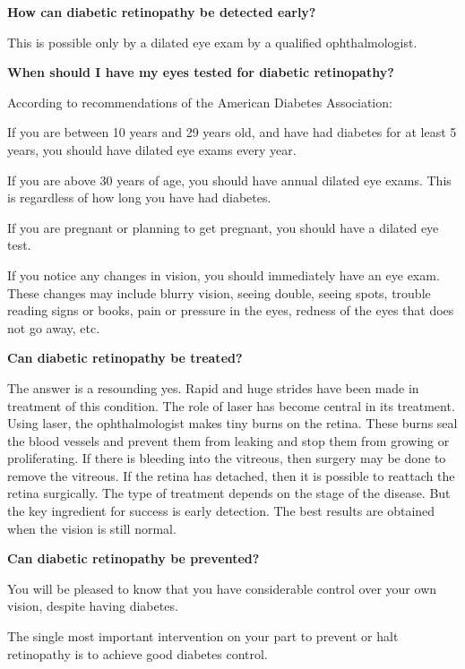 {\textbf{How can diabetic retinopathy be detected early?}

This is possible only by a dilated eye exam by a qualified ophthalmologist.

\textbf{When should I have my eyes tested for diabetic retinopathy?}

According to recommendations of the American Diabetes Association:

\item If you are between 10 years and 29 years old, and have had diabetes for at least 5 years, you should have dilated eye exams every year.

 \item If you are above 30 years of age, you should have annual dilated eye exams. This is regardless of how long you have had diabetes.

 \item If you are pregnant or planning to get pregnant, you should have a dilated eye test.

 \item If you notice any changes in vision, you should immediately have an eye exam. These changes may include blurry vision, seeing double, seeing spots, trouble reading signs or books, pain or pressure in the eyes, redness of the eyes that does not go away, etc.

\textbf{Can diabetic retinopathy be treated?}

The answer is a resounding yes. Rapid and huge strides have been made in treatment of this condition. The role of laser has become central in its treatment. Using laser, the ophthalmologist makes tiny burns on the retina. These burns seal the blood vessels and prevent them from leaking and stop them from growing or proliferating. If there is bleeding into the vitreous, then surgery may be done to remove the vitreous. If the retina has detached, then it is possible to reattach the retina surgically. The type of treatment depends on the stage of the disease. But the key ingredient for success is early detection. The best results are obtained when the vision is still normal.

\textbf{Can diabetic retinopathy be prevented?}

You will be pleased to know that you have considerable control over your own vision, despite having diabetes.

\item The single most important intervention on your part to prevent or halt retinopathy is to achieve good diabetes control.

}
